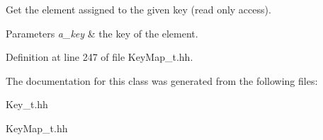 Get the element assigned to the given key (read only access). 


\begin{DoxyParams}{Parameters}
{\em a\-\_\-key} & the key of the element. \\
\hline
\end{DoxyParams}


Definition at line 247 of file Key\-Map\-\_\-t.\-hh.



The documentation for this class was generated from the following files\-:\begin{DoxyCompactItemize}
\item 
Key\-\_\-t.\-hh\item 
Key\-Map\-\_\-t.\-hh\end{DoxyCompactItemize}
